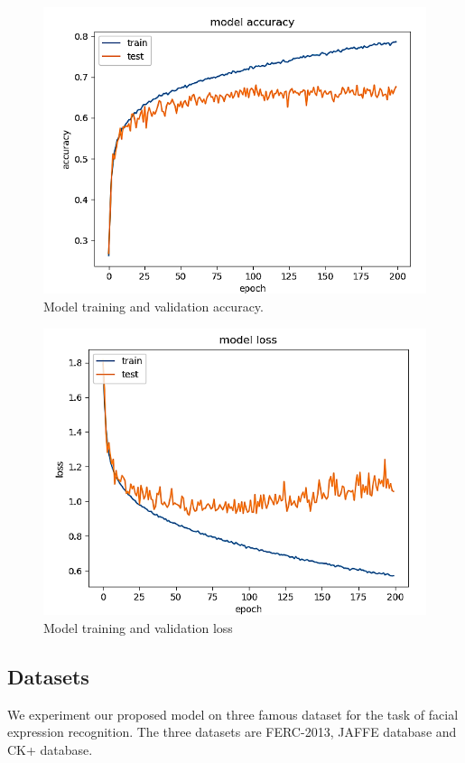 \documentclass[master]{thesis-uestc}
\begin{document}
\begin{figure}[ht]
\includegraphics[width=5in]{pic/model_accuracy_fer.png}
\caption{Model training and validation accuracy.}
\label{fer_accuracy}
\end{figure}

\begin{figure}[ht]
\includegraphics[width=5in]{pic/model_loss_fer.png}
\caption{Model training and validation loss}
\label{fer_loss}
\end{figure}

\subsection{Datasets}
We experiment our proposed model on three famous dataset for the task of facial expression recognition. The three datasets are FERC-2013, JAFFE database and CK+ database.
\end{document}
